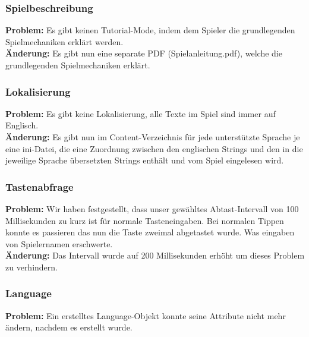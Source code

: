 
\subsubsection*{Spielbeschreibung}

\textbf{Problem:}
Es gibt keinen Tutorial-Mode, indem dem Spieler die grundlegenden Spielmechaniken erklärt werden.\\

\textbf{Änderung:} Es gibt nun eine separate PDF (\glqq Spielanleitung.pdf\grqq), welche die grundlegenden Spielmechaniken erklärt.\\



\subsubsection*{Lokalisierung}

\textbf{Problem:}
Es gibt keine Lokalisierung, alle Texte im Spiel sind immer auf Englisch.\\

\textbf{Änderung:} Es gibt nun im Content-Verzeichnis für jede unterstützte Sprache je eine ini-Datei, die eine Zuordnung zwischen den englischen Strings und den in die jeweilige Sprache übersetzten Strings enthält und vom Spiel eingelesen wird.\\



\subsubsection*{Tastenabfrage}
\textbf{Problem:}
Wir haben festgestellt, dass unser gewähltes Abtast-Intervall von 100 Millisekunden zu kurz ist für normale Tasteneingaben. Bei normalen Tippen konnte es passieren das nun die Taste zweimal abgetastet wurde. Was eingaben von Spielernamen erschwerte.\\

\textbf{Änderung:} Das Intervall wurde auf 200 Millisekunden erhöht um dieses Problem zu verhindern.\\



\subsubsection*{Language}
\textbf{Problem:}
Ein erstelltes Language-Objekt konnte seine Attribute nicht mehr ändern, nachdem es erstellt wurde.\\

